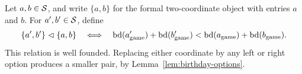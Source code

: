 \begin{definition}
  \label{def:surreal-pair-induction}
  \leanok
  Let \(a,b\in\mathcal{S}\), and write \(\{a,b\}\) for the formal two-coordinate object with
  entries \(a\) and \(b\).  For \(a',b'\in\mathcal{S}\), define
  \[
    \{a',b'\}\mathrel{\vartriangleleft}\{a,b\}
      \quad\Longleftrightarrow\quad
    \operatorname{bd}(a'_{\mathrm{game}})+\operatorname{bd}(b'_{\mathrm{game}})
      <\operatorname{bd}(a_{\mathrm{game}})+\operatorname{bd}(b_{\mathrm{game}}).
  \]
  This relation is well founded.  Replacing either coordinate by any left or right option
  produces a smaller pair, by Lemma~\ref{lem:birthday-options}.
\end{definition}
